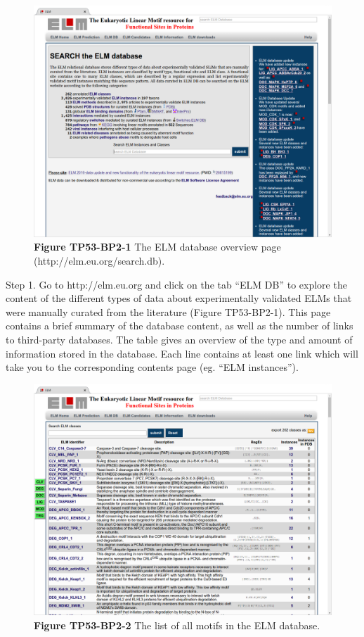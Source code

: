 \begin{figure}[h!]
\centering
\includegraphics[width=\textwidth]{Figures/TP53_2/stats.png} 
\caption{
\textbf{Figure TP53-BP2-1}
The ELM database overview page (http://elm.eu.org/search.db).
}
\end{figure}

Step 1. Go to http://elm.eu.org and click on the tab ``ELM DB'' to
explore the content of the different types of data about experimentally
validated ELMs that were manually curated from the literature (Figure
TP53-BP2-1). This page contains a brief summary of the database content,
as well as the number of links to third-party databases. The table gives
an overview of the type and amount of information stored in the
database. Each line contains at least one link which will take you to
the corresponding contents page (eg. ``ELM instances'').

\begin{figure}[h!]
\centering
\includegraphics[width=\textwidth]{Figures/TP53_2/elms.png} 
\caption{
\textbf{Figure TP53-BP2-2}
The list of all motifs in the ELM database.
}
\end{figure}

